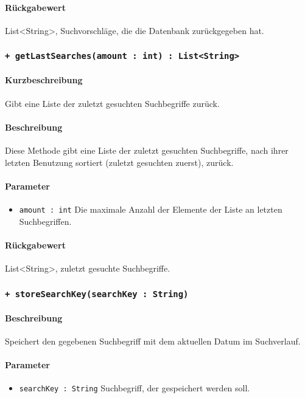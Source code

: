 \paragraph*{Rückgabewert}
List<String>, Suchvorschläge, die die Datenbank zurückgegeben hat.

 \subsubsection*{\texttt{+ getLastSearches(amount : int) : List<String>}}%
\paragraph*{Kurzbeschreibung}
Gibt eine Liste der zuletzt gesuchten Suchbegriffe zurück.
\paragraph*{Beschreibung}
Diese Methode gibt eine Liste der zuletzt gesuchten Suchbegriffe, nach ihrer letzten Benutzung sortiert (zuletzt gesuchten zuerst), zurück.
\paragraph*{Parameter}
\begin{itemize}
    \item \texttt{amount : int} Die maximale Anzahl der Elemente der Liste an letzten Suchbegriffen.
\end{itemize}
\paragraph*{Rückgabewert}
List<String>, zuletzt gesuchte Suchbegriffe.

 \subsubsection*{\texttt{+ storeSearchKey(searchKey : String)}}%
\paragraph*{Beschreibung}
Speichert den gegebenen Suchbegriff mit dem aktuellen Datum im Suchverlauf.
\paragraph*{Parameter}
\begin{itemize}
    \item \texttt{searchKey : String} Suchbegriff, der gespeichert werden soll.
\end{itemize}
